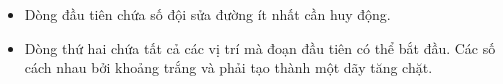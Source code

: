 \begin{itemize}
	\item     Dòng đầu tiên chứa số đội sửa đường ít nhất cần huy động.   
	\item     Dòng thứ hai chứa tất cả các vị trí mà đoạn đầu tiên có thể bắt đầu. Các số cách nhau bởi khoảng trắng và phải tạo thành một dãy tăng chặt.   
\end{itemize}

\